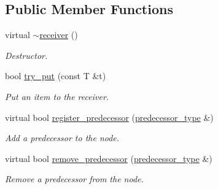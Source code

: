 \subsection*{Public Member Functions}
\begin{DoxyCompactItemize}
\item 
\hypertarget{classtbb_1_1flow_1_1interface7_1_1receiver_a733889a9053478ef2fb2528e2205bf07}{}virtual \hyperlink{classtbb_1_1flow_1_1interface7_1_1receiver_a733889a9053478ef2fb2528e2205bf07}{$\sim$receiver} ()\label{classtbb_1_1flow_1_1interface7_1_1receiver_a733889a9053478ef2fb2528e2205bf07}

\begin{DoxyCompactList}\small\item\em Destructor. \end{DoxyCompactList}\item 
\hypertarget{classtbb_1_1flow_1_1interface7_1_1receiver_aee5067bb4f4b71ffa786c1b33cb9aa6a}{}bool \hyperlink{classtbb_1_1flow_1_1interface7_1_1receiver_aee5067bb4f4b71ffa786c1b33cb9aa6a}{try\+\_\+put} (const T \&t)\label{classtbb_1_1flow_1_1interface7_1_1receiver_aee5067bb4f4b71ffa786c1b33cb9aa6a}

\begin{DoxyCompactList}\small\item\em Put an item to the receiver. \end{DoxyCompactList}\item 
\hypertarget{classtbb_1_1flow_1_1interface7_1_1receiver_a16427aa709505de93ffe0d79136e4251}{}virtual bool \hyperlink{classtbb_1_1flow_1_1interface7_1_1receiver_a16427aa709505de93ffe0d79136e4251}{register\+\_\+predecessor} (\hyperlink{classtbb_1_1flow_1_1interface7_1_1receiver_afbadf5511bd568d283040cd88bd4e81e}{predecessor\+\_\+type} \&)\label{classtbb_1_1flow_1_1interface7_1_1receiver_a16427aa709505de93ffe0d79136e4251}

\begin{DoxyCompactList}\small\item\em Add a predecessor to the node. \end{DoxyCompactList}\item 
\hypertarget{classtbb_1_1flow_1_1interface7_1_1receiver_a55adae6228bbdc1539695e1ec20e9762}{}virtual bool \hyperlink{classtbb_1_1flow_1_1interface7_1_1receiver_a55adae6228bbdc1539695e1ec20e9762}{remove\+\_\+predecessor} (\hyperlink{classtbb_1_1flow_1_1interface7_1_1receiver_afbadf5511bd568d283040cd88bd4e81e}{predecessor\+\_\+type} \&)\label{classtbb_1_1flow_1_1interface7_1_1receiver_a55adae6228bbdc1539695e1ec20e9762}

\begin{DoxyCompactList}\small\item\em Remove a predecessor from the node. \end{DoxyCompactList}\end{DoxyCompactItemize}
